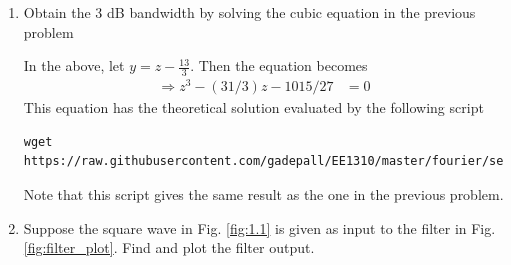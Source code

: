 \documentclass[journal,12pt,twocolumn]{IEEEtran}
\renewcommand\thesection{\arabic{section}}
\begin{document}
\begin{enumerate}[label=\thesection.\arabic*
,ref=\thesection.\theenumi]
%
%
This yields the value $f_{3\, dB} = 2.3395$ Hz.
\item
Obtain the 3 dB bandwidth by solving the cubic equation in the previous problem

%
\solution In the above, let $y = z - \frac{13}{3}$.  Then the equation becomes
\begin{align}
\Rightarrow z^3 - (31/3)z  -1015/27  & = 0
\end{align}
This equation has the theoretical solution evaluated by the following script
%
\begin{lstlisting}
wget https://raw.githubusercontent.com/gadepall/EE1310/master/fourier/series/codes/2.4.py
\end{lstlisting}

%
Note that this script gives the same result as the one in the previous problem.
%
\item
\label{filter_op}
Suppose the square wave in Fig. \ref{fig:1.1} is given as input to the filter in Fig. \ref{fig:filter_plot}.  Find and plot the filter output.


\end{enumerate}
\end{document}
